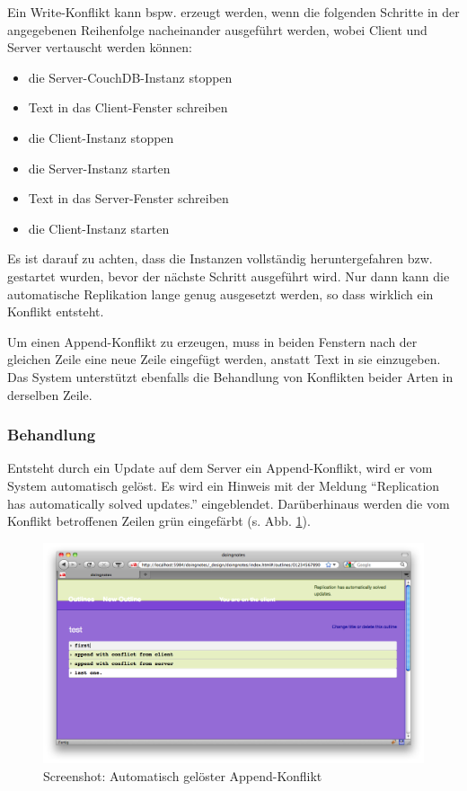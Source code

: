 Ein Write-Konflikt kann bspw. erzeugt werden, wenn die folgenden Schritte in der angegebenen Reihenfolge nacheinander ausgeführt werden, wobei Client und Server vertauscht werden können:

\begin{itemize}
\item die Server-CouchDB-Instanz stoppen
\item Text in das Client-Fenster schreiben 
\item die Client-Instanz stoppen
\item die Server-Instanz starten 
\item Text in das Server-Fenster schreiben 
\item die Client-Instanz starten 
\end{itemize}

Es ist darauf zu achten, dass die Instanzen vollständig heruntergefahren bzw. gestartet wurden, bevor der nächste Schritt ausgeführt wird. Nur dann kann die automatische Replikation lange genug ausgesetzt werden, so dass wirklich ein Konflikt entsteht. 

Um einen Append-Konflikt zu erzeugen, muss in beiden Fenstern nach der gleichen Zeile eine neue Zeile eingefügt werden, anstatt Text in sie einzugeben. Das System unterstützt ebenfalls die Behandlung von Konflikten beider Arten in derselben Zeile. 


\subsubsection{Behandlung}



Entsteht durch ein Update auf dem Server ein Append-Konflikt, wird er vom System automatisch gelöst. Es wird ein Hinweis mit der Meldung \enquote{Replication has automatically solved updates.} eingeblendet. Darüberhinaus werden die vom Konflikt betroffenen Zeilen grün eingefärbt (s. Abb. \ref{fig:appendconflict}). 


\medskip
\begin{figure}[ht] 
  \begin{center}
  \includegraphics[width=\textwidth]{grafik/screenshot-append-conflict} 
  \end{center}
  \caption{Screenshot: Automatisch gelöster Append-Konflikt}
  \label{fig:appendconflict} 
\end{figure}





